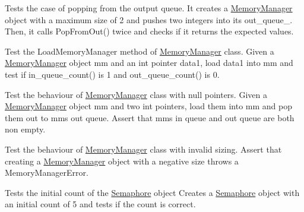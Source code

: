 \begin{DoxyRefList}
\item[Member \mbox{\hyperlink{memory__manager_8test_8cc_a9ef81e729010668e97ba03644b2c2424}{TEST}} (Memory\+Manager\+Test, Pop\+From\+Out)]\label{test__test000005}%
%
Tests the case of popping from the output queue. It creates a \mbox{\hyperlink{classMemoryManager}{Memory\+Manager}} object with a maximum size of 2 and pushes two integers into its out\+\_\+queue\+\_\+. Then, it calls Pop\+From\+Out() twice and checks if it returns the expected values.  
\item[Member \mbox{\hyperlink{memory__manager_8test_8cc_aecbee3af655cacde7a60394e8f1e88be}{TEST}} (Memory\+Manager\+Test, Load\+Memory\+Manager)]\label{test__test000006}%
%
Test the Load\+Memory\+Manager method of \mbox{\hyperlink{classMemoryManager}{Memory\+Manager}} class. Given a \mbox{\hyperlink{classMemoryManager}{Memory\+Manager}} object mm and an int pointer data1, load data1 into mm and test if in\+\_\+queue\+\_\+count() is 1 and out\+\_\+queue\+\_\+count() is 0.  
\item[Member \mbox{\hyperlink{memory__manager_8test_8cc_af5fbaada89aab5d80010625b03297b5b}{TEST}} (Memory\+Manager\+Test, Null\+Ptr)]\label{test__test000007}%
%
Test the behaviour of \mbox{\hyperlink{classMemoryManager}{Memory\+Manager}} class with null pointers. Given a \mbox{\hyperlink{classMemoryManager}{Memory\+Manager}} object mm and two int pointers, load them into mm and pop them out to mm\textquotesingle{}s out queue. Assert that mm\textquotesingle{}s in queue and out queue are both non empty. 
\item[Member \mbox{\hyperlink{memory__manager_8test_8cc_a5f84596eef72e6d8af087735d225893c}{TEST}} (Memory\+Manager\+Test, Bad\+Sizing)]\label{test__test000008}%
%
Test the behaviour of \mbox{\hyperlink{classMemoryManager}{Memory\+Manager}} class with invalid sizing. Assert that creating a \mbox{\hyperlink{classMemoryManager}{Memory\+Manager}} object with a negative size throws a Memory\+Manager\+Error.  
\item[Member \mbox{\hyperlink{semaphore_8test_8cc_af650c646e82923c918453607b393031e}{TEST}} (Semaphore\+Test, Initial\+Count)]\label{test__test000009}%
%
Tests the initial count of the \mbox{\hyperlink{classSemaphore}{Semaphore}} object Creates a \mbox{\hyperlink{classSemaphore}{Semaphore}} object with an initial count of 5 and tests if the count is correct.  
\item[Member \mbox{\hyperlink{semaphore_8test_8cc_a45174a14d2cdeaa34e401178b0bd7f25}{TEST}} (Semaphore\+Test, Wait\+Signal)]\label{test__test000010}%

\end{DoxyRefList}
